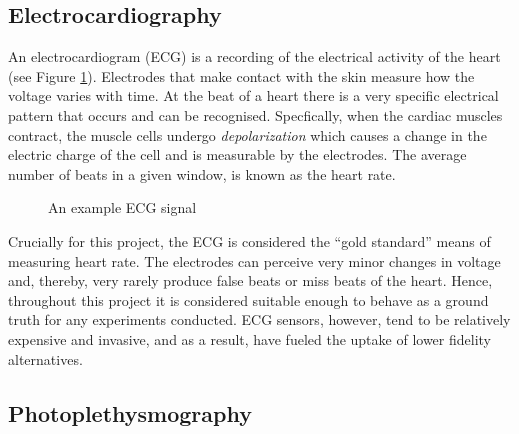 \subsection{Electrocardiography}
An electrocardiogram (ECG) is a recording of the electrical activity of the heart (see Figure \ref{fig:ecg_signal}). Electrodes that make contact with the skin measure how the voltage varies with time.
At the beat of a heart there is a very specific electrical pattern that occurs and can be recognised. Specfically, when the cardiac muscles contract, the muscle cells undergo
\textit{depolarization} which causes a change in the electric charge of the cell and is measurable by the electrodes.
The average number of beats in a given window, is known as the heart rate.
\begin{figure}
    \centering
    \scalebox{0.8}{}
   \caption{An example ECG signal} 
   \label{fig:ecg_signal}
\end{figure}
\noindent
Crucially for this project, the ECG is considered the ``gold standard'' means of measuring heart rate. The electrodes can perceive very minor changes in voltage and, thereby, very rarely produce false beats or miss beats of the heart. 
Hence, throughout this project it is considered suitable enough to behave as a ground truth for any experiments conducted.
ECG sensors, however, tend to be relatively expensive and invasive, and as a result, have fueled the uptake of lower fidelity alternatives.

\subsection{Photoplethysmography}

